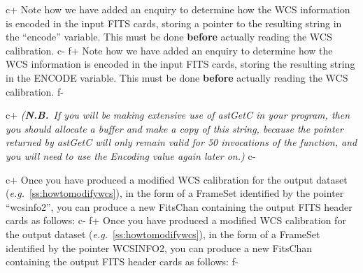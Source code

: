 \documentclass[twoside,11pt]{article}
\newcommand{\secref}[1]{\S\ref{#1}}
\renewcommand{\secref}[1]{\ref{#1}}
\begin{document}
c+
Note how we have added an enquiry to determine how the WCS information
is encoded in the input FITS cards, storing a pointer to the resulting
string in the ``encode'' variable. This must be done {\bf{before}}
actually reading the WCS calibration.
c-
f+
Note how we have added an enquiry to determine how the WCS information
is encoded in the input FITS cards, storing the resulting string in
the ENCODE variable. This must be done {\bf{before}} actually reading
the WCS calibration.
f-

c+
{\em{({\bf{N.B.}}\ If you will be making extensive use of astGetC in
your program, then you should allocate a buffer and make a copy of
this string, because the pointer returned by astGetC will only remain
valid for 50 invocations of the function, and you will need to use the
Encoding value again later on.)}}
c-

c+
Once you have produced a modified WCS calibration for the output
dataset ({\em{e.g.}}\ \secref{ss:howtomodifywcs}), in the form of a
FrameSet identified by the pointer ``wcsinfo2'', you can produce a new
FitsChan containing the output FITS header cards as follows:
c-
f+
Once you have produced a modified WCS calibration for the output
dataset ({\em{e.g.}}\ \secref{ss:howtomodifywcs}), in the form of a
FrameSet identified by the pointer WCSINFO2, you can produce a new
FitsChan containing the output FITS header cards as follows:
f-
\end{document}
